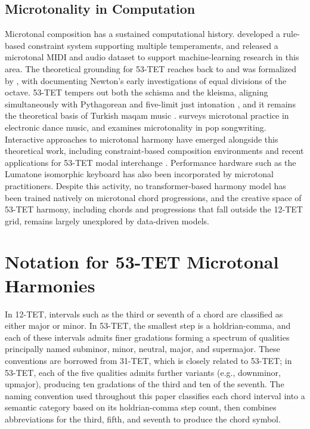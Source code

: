 \documentclass{aimc2026}
\begin{document}
\subsection{Microtonality in Computation}
Microtonal composition has a sustained computational history. \citet{anders2010computational} developed a rule-based constraint system supporting multiple temperaments, and \citet{hirai2023microtonal} released a microtonal MIDI and audio dataset to support machine-learning research in this area. The theoretical grounding for 53-TET reaches back to \citet{holder1731treatise} and was formalized by \citet{fokker1955equal, fokker1963refinement}, with \citet{muzzulini2020isaac} documenting Newton's early investigations of equal divisions of the octave. 53-TET tempers out both the schisma and the kleisma, aligning simultaneously with Pythagorean and five-limit just intonation \citep{tanaka1890studien}, and it remains the theoretical basis of Turkish maqam music \citep{yarman2007comparative}. \citet{hart2016microtonal} surveys microtonal practice in electronic dance music, and \citet{chadwin2019applying} examines microtonality in pop songwriting. Interactive approaches to microtonal harmony have emerged alongside this theoretical work, including constraint-based composition environments and recent applications for 53-TET modal interchange \citep{dalmazzo2025computer}. Performance hardware such as the Lumatone isomorphic keyboard \citep{lumatone2024} has also been incorporated by microtonal practitioners. Despite this activity, no transformer-based harmony model has been trained natively on microtonal chord progressions, and the creative space of 53-TET harmony, including chords and progressions that fall outside the 12-TET grid, remains largely unexplored by data-driven models.


\section{Notation for 53-TET Microtonal Harmonies}
\label{sec:notation}

In 12-TET, intervals such as the third or seventh of a chord are classified as either major or minor. In 53-TET, the smallest step is a holdrian-comma, and each of these intervals admits finer gradations forming a spectrum of qualities principally named subminor, minor, neutral, major, and supermajor. These conventions are borrowed from 31-TET, which is closely related to 53-TET; in 53-TET, each of the five qualities admits further variants (e.g., downminor, upmajor), producing ten gradations of the third and ten of the seventh. The naming convention used throughout this paper classifies each chord interval into a semantic category based on its holdrian-comma step count, then combines abbreviations for the third, fifth, and seventh to produce the chord symbol.
\end{document}
